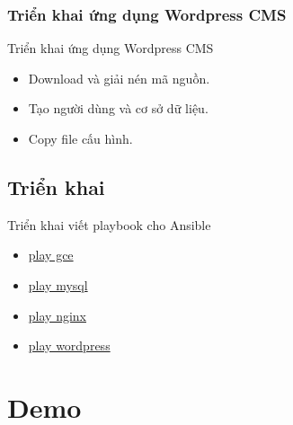 \documentclass[14pt]{beamer}
\begin{document}
\subsubsection*{Triển khai ứng dụng Wordpress CMS}
\begin{frame}{Triển khai ứng dụng Wordpress CMS}
\begin{itemize}
\item Download và giải nén mã nguồn.
\item Tạo người dùng và cơ sở dữ liệu.
\item Copy file cấu hình.
\end{itemize}
\end{frame}

\subsection{Triển khai}
\begin{frame}{Triển khai viết playbook cho Ansible}
\begin{itemize}
\item \href{run:./src/gce-wordpress-nginx/roles/gce/tasks/main.yml}{play gce}
\item \href{run:./src/gce-wordpress-nginx/roles/mysql/tasks/main.yml}{play mysql}
\item \href{run:./src/gce-wordpress-nginx/roles/nginx/tasks/main.yml}{play nginx}
\item \href{run:./src/gce-wordpress-nginx/roles/wordpress/tasks/main.yml}{play wordpress}
\end{itemize}
\end{frame}

\section{Demo}
\begin{frame}
  \begin{center}
  \end{center}
\end{frame}
\end{document}
